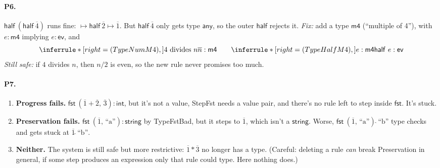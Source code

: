 \documentclass[11pt]{article}
\newcommand{\PAIR}[2]{(#1,\, #2)}
\newcommand{\FST}[1]{\mathsf{fst}\ #1}
\newcommand{\INT}{\mathsf{int}}
\newcommand{\STRING}{\mathsf{string}}
\newcommand{\ANY}{\mathsf{any}}
\newcommand{\num}[1]{\overline{#1}}
\newcommand{\str}[1]{\text{``#1''}}
\newcommand{\HALF}[1]{\mathsf{half}\ #1}
\newcommand{\EV}{\mathsf{ev}}
\newcommand{\MF}{\mathsf{m4}}
\begin{document}
\paragraph{P6.} $\HALF{(\HALF{\num4})}$ runs fine:
$\mapsto\HALF{\num2}\mapsto\num1$. But $\HALF{\num4}$ only gets type $\ANY$,
so the outer $\mathsf{half}$ rejects it. \emph{Fix:} add a type $\MF$
(``multiple of 4''), with $e:\MF$ implying $e:\EV$, and
\[
  \Rule{TypeNumM4}{\text{$4$ divides $n$}}{\num n:\MF}
  \qquad
  \Rule{TypeHalfM4}{e:\MF}{\HALF{e}:\EV}
\]
\emph{Still safe:} if $4$ divides $n$, then $n/2$ is even, so the new rule
never promises too much.

\paragraph{P7.}
\begin{enumerate}
  \item \textbf{Progress fails.} $\FST{\PAIR{\num1+\num2}{\num3}}:\INT$, but
        it's not a value, StepFst needs a value pair, and there's no rule
        left to step inside $\mathsf{fst}$. It's stuck.
  \item \textbf{Preservation fails.} $\FST{\PAIR{\num1}{\str{a}}}:\STRING$ by
        TypeFstBad, but it steps to $\num1$, which isn't a $\STRING$. Worse,
        $\FST{\PAIR{\num1}{\str{a}}}\,\hat{}\,\str{b}$ type checks and gets
        stuck at $\num1\,\hat{}\,\str{b}$.
  \item \textbf{Neither.} The system is still safe but more restrictive:
        $\num1*\num3$ no longer has a type. (Careful: deleting a rule
        \emph{can} break Preservation in general, if some step produces an
        expression only that rule could type. Here nothing does.)
\end{enumerate}
\end{document}
